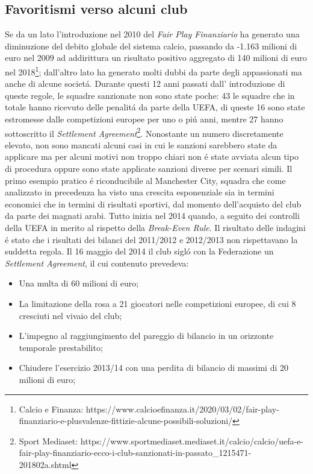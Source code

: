 \documentclass[
    corpo=12pt,
    oneside,
    evenboxes,
    tipotesi=triennale,
    stile=classica,
    oldstyle,
    autoretitolo,
    greek,
]{toptesi}
\begin{document}
\begin{interlinea}{1.5}
\section{Favoritismi verso alcuni club}
Se da un lato l'introduzione nel 2010 del \emph{Fair Play Finanziario} ha generato una diminuzione del debito globale del sistema calcio,
passando da -1.163 milioni di euro nel 2009 ad addirittura un risultato positivo aggregato di 140 milioni di euro nel 2018\footnote{Calcio e Finanza: https://www.calcioefinanza.it/2020/03/02/fair-play-finanziario-e-plusvalenze-fittizie-alcune-possibili-soluzioni/};
dall'altro lato ha generato molti dubbi da parte degli appassionati ma anche di alcune societ\'a. Durante questi 12 anni passati dall'
introduzione di queste regole, le squadre sanzionate non sono state poche: 43 le squadre che in totale hanno ricevuto delle penalit\'a
da parte della UEFA, di queste 16 sono state estromesse dalle competizioni europee per uno o pi\'u anni, mentre 27 hanno sottoscritto il 
\emph{Settlement Agreement}\footnote{Sport Mediaset: https://www.sportmediaset.mediaset.it/calcio/calcio/uefa-e-fair-play-finanziario-ecco-i-club-sanzionati-in-passato\_1215471-201802a.shtml}. 
Nonostante un numero discretamente elevato, non sono mancati alcuni casi in cui le sanzioni sarebbero state da
applicare ma per alcuni motivi non troppo chiari non \'e state avviata alcun tipo di procedura oppure sono state applicate sanzioni diverse per
scenari simili.\newline
Il primo esempio pratico \'e riconducibile al Manchester City, squadra che come analizzato in precedenza ha visto una crescita esponenziale
sia in termini economici che in termini di risultati sportivi, dal momento dell'acquisto del club da parte dei magnati arabi. Tutto inizia 
nel 2014 quando, a seguito dei controlli della UEFA in merito al rispetto della \emph{Break-Even Rule}. Il risultato delle indagini \'e stato
che i risultati dei bilanci del 2011/2012 e 2012/2013 non rispettavano la suddetta regola. Il 16 maggio del 2014 il club sigl\'o con la Federazione
un \emph{Settlement Agreement}, il cui contenuto prevedeva:
\begin{itemize}
    \item Una multa di 60 milioni di euro;
    \item La limitazione della rosa a 21 giocatori nelle competizioni europee, di cui 8 cresciuti nel vivaio del club;
    \item L’impegno al raggiungimento del pareggio di bilancio in un orizzonte temporale prestabilito;
    \item Chiudere l’esercizio 2013/14 con una perdita di bilancio di massimi di 20 milioni di euro;

\end{itemize}
\end{interlinea}
\end{document}
